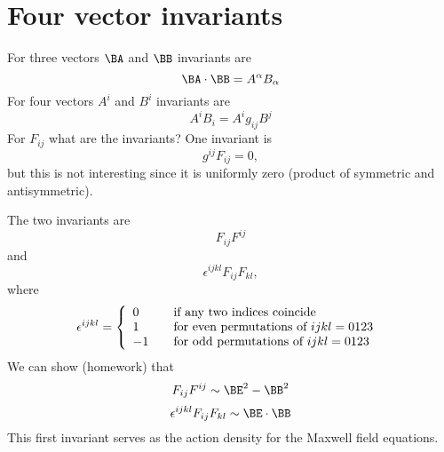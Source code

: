 %
%
\section{Four vector invariants}

For three vectors \(\BA\) and \(\BB\) invariants are
%
\begin{equation}\label{eqn:relativisticElectrodynamicsL11:510}
\BA \cdot \BB = A^\alpha B_\alpha
\end{equation}
%
For four vectors \(A^i\) and \(B^i\) invariants are
%
\begin{equation}\label{eqn:relativisticElectrodynamicsL11:530}
A^i B_i = A^i g_{i j} B^j
\end{equation}
%
For \(F_{i j}\) what are the invariants?  One invariant is
%
\begin{equation}\label{eqn:relativisticElectrodynamicsL11:550}
g^{i j} F_{i j} = 0,
\end{equation}
%
but this is not interesting since it is uniformly zero (product of symmetric and antisymmetric).

The two invariants are
%
\begin{equation}\label{eqn:relativisticElectrodynamicsL11:570}
F_{i j}F^{i j}
\end{equation}
%
and
%
\begin{equation}\label{eqn:relativisticElectrodynamicsL11:590}
\epsilon^{i j k l} F_{i j}F_{k l},
\end{equation}
where
\begin{equation}\label{eqn:relativisticElectrodynamicsL11:610}
\epsilon^{i j k l} =
\left\{
\begin{array}{l l}
0 & \quad \mbox{if any two indices coincide} \\
1 & \quad \mbox{for even permutations of \(i j k l=0123\) } \\
-1 & \quad \mbox{for odd permutations of \(i j k l=0123\) } \\
\end{array}
\right.
\end{equation}
%
We can show (homework) that
%
\begin{equation}\label{eqn:relativisticElectrodynamicsL11:630}
F_{i j}F^{i j} \sim \BE^2 - \BB^2
\end{equation}
%
\begin{equation}\label{eqn:relativisticElectrodynamicsL11:650}
\epsilon^{i j k l} F_{i j}F_{k l} \sim \BE \cdot \BB
\end{equation}
%
This first invariant serves as the action density for the Maxwell field equations.

